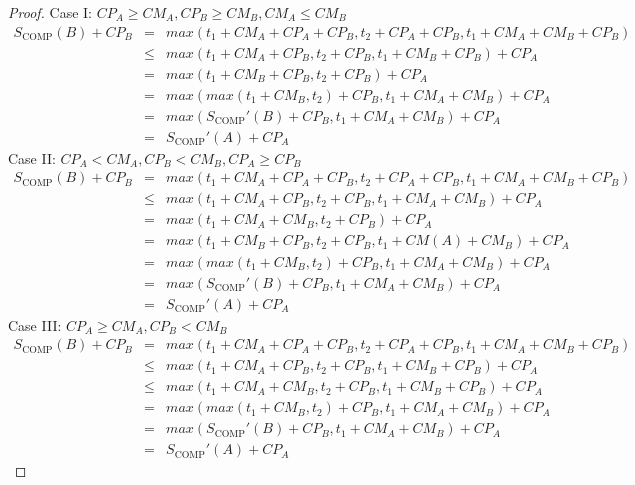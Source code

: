 \documentclass[sigconf]{acmart}
\newcommand{\scomp}{\ensuremath{{S}_{\text{COMP}}}}
\begin{document}
\begin{proof}
	Case I: $CP_A \ge CM_A, CP_B \ge CM_B, CM_A \le CM_B$
	\begin{eqnarray*}
		\scomp(B) + CP_B & = & max(t_1 + CM_A + CP_A + CP_B, t_2 + CP_A + CP_B, t_1 + CM_A + CM_B + CP_B)\\
		& \le& max(t_1 + CM_A + CP_B, t_2  + CP_B, t_1  + CM_B + CP_B) + CP_A\\
		& = & max( t_1  + CM_B + CP_B, t_2  + CP_B) + CP_A \\
		& = & max(max(t_1 + CM_B, t_2) + CP_B, t_1 + CM_A + CM_B) + CP_A\\
		& = & max(\scomp'(B) + CP_B, t_1 + CM_A + CM_B) + CP_A \\
		& = & \scomp'(A) + CP_A
	\end{eqnarray*}
	Case II: $CP_A < CM_A, CP_B < CM_B, CP_A \ge CP_B$
	\begin{eqnarray*}
		\scomp(B) + CP_B & = & max(t_1 + CM_A + CP_A + CP_B, t_2 + CP_A + CP_B, t_1 + CM_A + CM_B + CP_B)\\
		& \le & max(t_1 + CM_A + CP_B, t_2+CP_B, t_1 + CM_A + CM_B) + CP_A\\
		& = & max(t_1 + CM_A + CM_B, t_2+ CP_B) + CP_A \\
		& = & max(t_1 + CM_B + CP_B, t_2 + CP_B, t_1 + CM(A) + CM_B) + CP_A \\
		& = & max(max(t_1 + CM_B, t_2) + CP_B, t_1 + CM_A + CM_B) + CP_A \\
		& = & max(\scomp'(B) + CP_B, t_1 + CM_A +CM_B) + CP_A \\
		& = & \scomp'(A) + CP_A
	\end{eqnarray*}
	Case III: $CP_A \ge CM_A, CP_B < CM_B$
	\begin{eqnarray*}
		\scomp(B) + CP_B & = & max(t_1 + CM_A + CP_A + CP_B, t_2 + CP_A + CP_B, t_1 + CM_A + CM_B + CP_B)\\
		& \le & max(t_1 + CM_A + CP_B, t_2 + CP_B, t_1 + CM_B + CP_B) + CP_A\\
		& \le & max(t_1 + CM_A + CM_B, t_2 + CP_B, t_1 + CM_B + CP_B) + CP_A \\
		& = & max(max(t_1 + CM_B, t_2) + CP_B, t_1 + CM_A + CM_B) + CP_A \\
		& = & max(\scomp'(B) + CP_B, t_1 + CM_A +CM_B) + CP_A \\
		& = & \scomp'(A) + CP_A
	\end{eqnarray*}
\end{proof}
\end{document}
